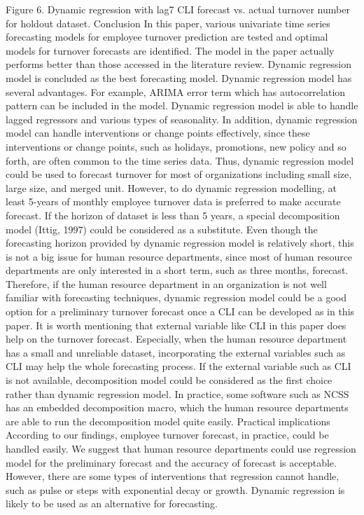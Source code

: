 Figure 6. Dynamic regression with lag7 CLI forecast vs. actual turnover number for holdout dataset. 
Conclusion
In this paper, various univariate time series forecasting models for employee turnover prediction are tested and optimal models for turnover forecasts are identified. The model in the paper actually performs better than those accessed in the literature review. Dynamic regression model is concluded as the best forecasting model. Dynamic regression model has several advantages. For example, ARIMA error term which has autocorrelation pattern can be included in the model. Dynamic regression model is able to handle lagged regressors and various types of seasonality. In addition, dynamic regression model can handle interventions or change points effectively, since these interventions or change points, such as holidays, promotions, new policy and so forth, are often common to the time series data. Thus, dynamic regression model could be used to forecast turnover for most of organizations including small size, large size, and merged unit. However, to do dynamic regression modelling, at least 5-years of monthly employee turnover data is preferred to make accurate forecast. If the horizon of dataset is less than 5 years, a special decomposition model (Ittig, 1997) could be considered as a substitute. Even though the forecasting horizon provided by dynamic regression model is relatively short, this is not a big issue for human resource departments, since most of human resource departments are only interested in a short term, such as three months, forecast. Therefore, if the human resource department in an organization is not well familiar with forecasting techniques, dynamic regression model could be a good option for a preliminary turnover forecast once a CLI can be developed as in this paper. It is worth mentioning that external variable like CLI in this paper does help on the turnover forecast. Especially, when the human resource department has a small and unreliable dataset, incorporating the external variables such as CLI may help the whole forecasting process. If the external variable such as CLI is not available, decomposition model could be considered as the first choice rather than dynamic regression model. In practice, some software such as NCSS has an embedded decomposition macro, which the human resource departments are able to run the decomposition model quite easily.
Practical implications
According to our findings, employee turnover forecast, in practice, could be handled easily. We suggest that human resource departments could use regression model for the preliminary forecast and the accuracy of forecast is acceptable. However, there are some types of interventions that regression cannot handle, such as pulse or steps with exponential decay or growth. Dynamic regression is likely to be used as an alternative for forecasting.
